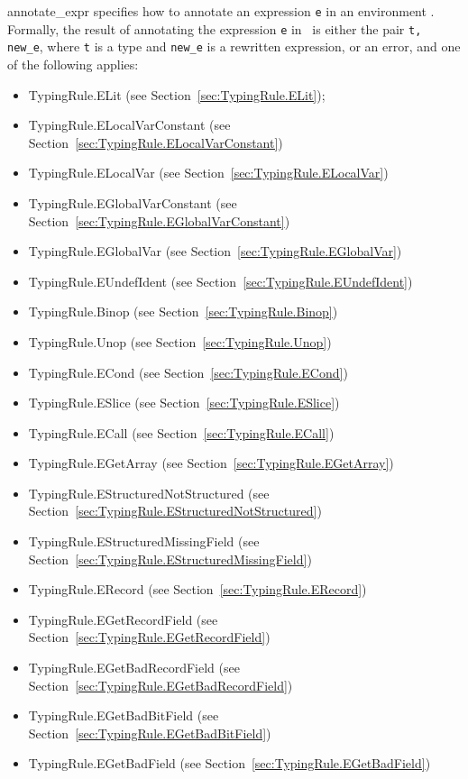 \documentclass{book}
\begin{document}
\begin{itemize}
\textsf{annotate\_expr} specifies how to annotate an expression \texttt{e} in
an environment \tenv.  Formally, the result of annotating the expression
\texttt{e} in \tenv\ is either the pair \texttt{t, new\_e}, where \texttt{t} is a type and
\texttt{new\_e} is a rewritten expression, or an error, and one of the following applies:
\begin{itemize}
\item TypingRule.ELit (see Section~\ref{sec:TypingRule.ELit});
\item TypingRule.ELocalVarConstant (see Section~\ref{sec:TypingRule.ELocalVarConstant})
\item TypingRule.ELocalVar (see Section~\ref{sec:TypingRule.ELocalVar})
\item TypingRule.EGlobalVarConstant (see Section~\ref{sec:TypingRule.EGlobalVarConstant})
\item TypingRule.EGlobalVar (see Section~\ref{sec:TypingRule.EGlobalVar})
\item TypingRule.EUndefIdent (see Section~\ref{sec:TypingRule.EUndefIdent})
\item TypingRule.Binop (see Section~\ref{sec:TypingRule.Binop})
\item TypingRule.Unop (see Section~\ref{sec:TypingRule.Unop})
\item TypingRule.ECond (see Section~\ref{sec:TypingRule.ECond})
\item TypingRule.ESlice (see Section~\ref{sec:TypingRule.ESlice})
\item TypingRule.ECall (see Section~\ref{sec:TypingRule.ECall})
\item TypingRule.EGetArray (see Section~\ref{sec:TypingRule.EGetArray})
\item TypingRule.EStructuredNotStructured (see Section~\ref{sec:TypingRule.EStructuredNotStructured})
\item TypingRule.EStructuredMissingField (see Section~\ref{sec:TypingRule.EStructuredMissingField})
\item TypingRule.ERecord (see Section~\ref{sec:TypingRule.ERecord})
\item TypingRule.EGetRecordField (see Section~\ref{sec:TypingRule.EGetRecordField})
\item TypingRule.EGetBadRecordField (see Section~\ref{sec:TypingRule.EGetBadRecordField})
\item TypingRule.EGetBadBitField (see Section~\ref{sec:TypingRule.EGetBadBitField})
\item TypingRule.EGetBadField (see Section~\ref{sec:TypingRule.EGetBadField})

\end{itemize}
\end{itemize}
\end{document}
